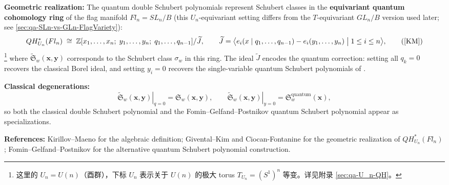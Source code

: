 \textbf{Geometric realization:} The quantum double Schubert polynomials represent Schubert classes in the \textbf{equivariant quantum cohomology ring} of the flag manifold $Fl_n = SL_n/B$ (this $U_n$-equivariant setting differs from the $T$-equivariant $GL_n/B$ version used later; see \cref{sec:qa-SLn-vs-GLn-FlagVariety}):
\[
QH_{U_n}^*(Fl_n) \;\cong\; \mathbb{Z}[x_1,\ldots,x_n;\; y_1,\ldots,y_n;\; q_1,\ldots,q_{n-1}] / \widetilde{J},
\qquad
\widetilde{J} = \big\langle e_i(x \mid q_1,\ldots,q_{n-1}) - e_i(y_1,\ldots,y_n) \;\big|\; 1 \leq i \leq n \big\rangle,
\tag{\cite[ Theorem 8]{KM}}
\]\footnote{这里的 $U_n = U(n)$（酉群），下标 $U_n$ 表示关于 $U(n)$ 的极大 torus $T_{U_n} = (S^1)^n$ 等变。详见附录 \cref{sec:qa-U_n-QH}。}
where $\widetilde{\mathfrak{S}}_w(\mathbf{x},\mathbf{y})$ corresponds to the Schubert class $\sigma_w$ in this ring. The ideal $\widetilde{J}$ encodes the quantum correction: setting all $q_k = 0$ recovers the classical Borel ideal, and setting $y_i = 0$ recovers the single-variable quantum Schubert polynomials of \cite{FominGelfandPostnikov1997}.

\textbf{Classical degenerations:}
\[
\left. \widetilde{\mathfrak{S}}_w(\mathbf{x},\mathbf{y}) \right|_{q=0} = \mathfrak{S}_w(\mathbf{x},\mathbf{y}),
\qquad
\left. \widetilde{\mathfrak{S}}_w(\mathbf{x},\mathbf{y}) \right|_{y=0} = \mathfrak{S}_w^{\mathrm{quantum}}(\mathbf{x}),
\]
so both the classical double Schubert polynomial and the Fomin--Gelfand--Postnikov quantum Schubert polynomial appear as specializations.

\textbf{References:} Kirillov--Maeno \cite{KM} for the algebraic definition; Givental--Kim \cite{GiventalKim1995} and Ciocan-Fontanine \cite{CiocanFontanine1997} for the geometric realization of $QH_{U_n}^*(Fl_n)$; Fomin--Gelfand--Postnikov \cite{FominGelfandPostnikov1997} for the alternative quantum Schubert polynomial construction.

